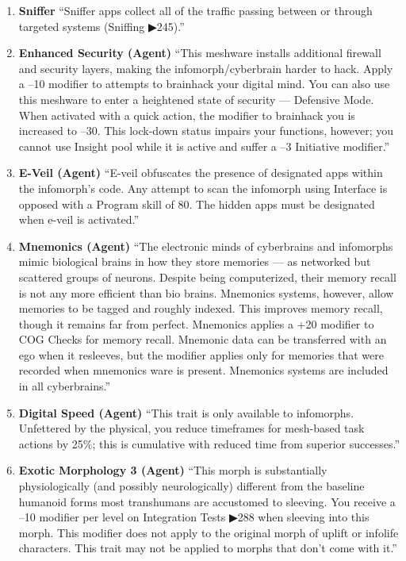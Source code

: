 \begin{enumerate}
    \item \textbf{Sniffer} “Sniffer apps collect all of the traffic passing between or through targeted systems (Sniffing ▶245).” \citep[pg. 326]{ep2e_1.1_2019}

    \item \textbf{Enhanced Security (Agent)} “This meshware installs additional firewall and security layers, making the infomorph/cyberbrain harder to hack. Apply a –10 modifier to attempts to brainhack your digital mind. You can also use this meshware to enter a heightened state of security — Defensive Mode. When activated with a quick action, the modifier to brainhack you is increased to –30. This lock-down status impairs your functions, however; you cannot use Insight pool while it is active and suffer a –3 Initiative modifier.” \citep[pg. 326]{ep2e_1.1_2019}

    \item \textbf{E-Veil (Agent)} “E-veil obfuscates the presence of designated apps within the infomorph’s code. Any attempt to scan the infomorph using Interface is opposed with a Program skill of 80. The hidden apps must be designated when e-veil is activated.” \citep[pg. 326]{ep2e_1.1_2019}

    \item \textbf{Mnemonics (Agent)} “The electronic minds of cyberbrains and infomorphs mimic biological brains in how they store memories — as networked but scattered groups of neurons. Despite being computerized, their memory recall is not any more efficient than bio brains. Mnemonics systems, however, allow memories to be tagged and roughly indexed. This improves memory recall, though it remains far from perfect. Mnemonics applies a +20 modifier to COG Checks for memory recall. Mnemonic data can be transferred with an ego when it resleeves, but the modifier applies only for memories that were recorded when mnemonics ware is present. Mnemonics systems are included in all cyberbrains.” \citep[pg. 316]{ep2e_1.1_2019}

    \item \textbf{Digital Speed (Agent)} “This trait is only available to infomorphs. Unfettered by the physical, you reduce timeframes for mesh-based task actions by 25\%; this is cumulative with reduced time from superior successes.” \citep[pg. 73]{ep2e_1.1_2019}

    \item \textbf{Exotic Morphology 3 (Agent)} “This morph is substantially physiologically (and possibly neurologically) different from the baseline humanoid forms most transhumans are accustomed to sleeving. You receive a –10 modifier per level on Integration Tests ▶288 when sleeving into this morph. This modifier does not apply to the original morph of uplift or infolife characters. This trait may not be applied to morphs that don’t come with it.” \citep[pg. 78]{ep2e_1.1_2019}


\end{enumerate}
